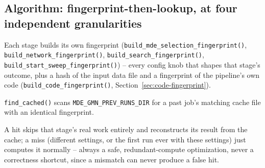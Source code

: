 \documentclass[11pt]{article}
\begin{document}
\subsection{Algorithm: fingerprint-then-lookup, at four independent granularities}
\begin{steps}
\item Each stage builds its own fingerprint (\texttt{build\_mde\_selection\_fingerprint()}, \texttt{build\_network\_fingerprint()}, \texttt{build\_search\_fingerprint()}, \texttt{build\_start\_sweep\_fingerprint()}) -- every config knob that shapes that stage's outcome, plus a hash of the input data file and a fingerprint of the pipeline's own code (\texttt{build\_code\_fingerprint()}, Section~\ref{sec:code-fingerprint}).
\item \texttt{find\_cached()} scans \texttt{MDE\_GMN\_PREV\_RUNS\_DIR} for a past job's matching cache file with an identical fingerprint.
\item A hit skips that stage's real work entirely and reconstructs its result from the cache; a miss (different settings, or the first run ever with these settings) just computes it normally -- always a safe, redundant-compute optimization, never a correctness shortcut, since a mismatch can never produce a false hit.
\end{steps}
\end{document}
